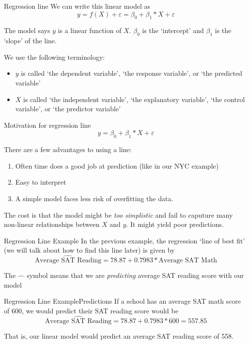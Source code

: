 \documentclass[aspectratio=169,t,11pt,table]{beamer}
\begin{document}
\begin{frame}{Regression line}
  We can write this linear model as 
  $$
    y = f(X) + \varepsilon = \beta_0 + \beta_1 * X + \varepsilon
  $$
  
  \bigskip
  The model says $y$ is a linear function of $X$. $\beta_0$ is the `intercept' and $\beta_1$ is the `slope' of the line. 
  
  \pause
  \bigskip
  We use the following terminology:
  \begin{itemize}
    \item $y$ is called `the dependent variable', `the response variable', or `the predicted variable' 
    
    \item $X$ is called `the independent variable', `the explanatory variable', `the control variable', or `the predictor variable'
  \end{itemize}
\end{frame}

\begin{frame}{Motivation for regression line}
  \vspace*{-2\bigskipamount}
  $$
    y = \beta_0 + \beta_1 * X + \varepsilon
  $$

  There are a few advantages to using a line:
  \begin{enumerate}
    \item Often time does a good job at prediction (like in our NYC example)
    \item Easy to interpret 
    \item A simple model faces less risk of overfitting the data.
  \end{enumerate}

  \bigskip
  The cost is that the model might be \emph{too simplistic} and fail to caputure many non-linear relationships between $X$ and $y$. It might yield poor predictions.
\end{frame}

\begin{frame}{Regression Line Example}
  In the previous example, the regression `line of best fit' (we will talk about how to find this line later) is given by 
  $$
    \widehat{\text{Average SAT Reading}} = 78.87 + 0.7983 * \text{Average SAT Math}
  $$
  
  The $\widehat{\quad}$ symbol means that we are \emph{predicting} average SAT reading score with our model
\end{frame}


\begin{frame}{Regression Line Example}{Predictions}
  If a school has an average SAT math score of 600, we would predict their SAT reading score would be 
  $$
    \widehat{\text{Average SAT Reading}} = 78.87 + 0.7983 * 600 = 557.85
  $$

  \pause 
  That is, our linear model would predict an average SAT reading score of 558.
\end{frame}
\end{document}
